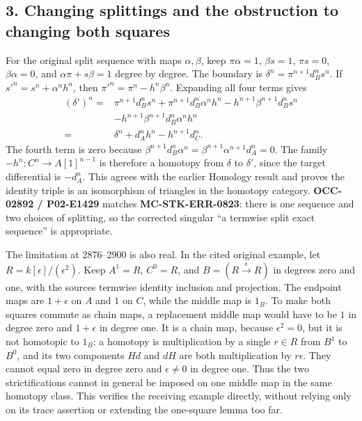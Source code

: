 \subsection{3. Changing splittings and the obstruction to changing both squares}\label{proofs-2419-2994-changing-splittings-and-the-obstruction-to-changing-both-squares}

For the original split sequence with maps \(\alpha,\beta\),\allowbreak{} keep \(\pi\alpha=1\),\allowbreak{} \(\beta s=1\),\allowbreak{} \(\pi s=0\),\allowbreak{} \(\beta\alpha=0\),\allowbreak{} and \(\alpha\pi+s\beta=1\) degree by degree. The boundary is \(\delta^n=\pi^{n+1}d_B^ns^n\). If \(s'^n=s^n+\alpha^nh^n\),\allowbreak{} then \(\pi'^n=\pi^n-h^n\beta^n\). Expanding all four terms gives \[
\begin{split}
(\delta')^n={}&\pi^{n+1}d_B^ns^n
+\pi^{n+1}d_B^n\alpha^nh^n
-h^{n+1}\beta^{n+1}d_B^ns^n\\
&-h^{n+1}\beta^{n+1}d_B^n\alpha^nh^n\\
={}&\delta^n+d_A^nh^n-h^{n+1}d_C^n.
\end{split}
\] The fourth term is zero because \(\beta^{n+1}d_B^n\alpha^n=\beta^{n+1}\alpha^{n+1}d_A^n=0\). The family \(-h^n:C^n\to A[1]^{n-1}\) is therefore a homotopy from \(\delta\) to \(\delta'\),\allowbreak{} since the target differential is \(-d_A^n\). This agrees with the earlier Homology result and proves the identity triple is an isomorphism of triangles in the homotopy category. \textbf{OCC-02892 /\allowbreak{} P02-E1429} matches \textbf{MC-STK-ERR-0823}:\allowbreak{} there is one sequence and two choices of splitting,\allowbreak{} so the corrected singular ``a termwise split exact sequence'' is appropriate.

The limitation at 2876–\allowbreak{}2900 is also real. In the cited original example,\allowbreak{} let \(R=k[\epsilon]/(\epsilon^2)\). Keep \(A^1=R\),\allowbreak{} \(C^0=R\),\allowbreak{} and \(B=(R\xrightarrow\epsilon R)\) in degrees zero and one,\allowbreak{} with the source\textquotesingle s termwise identity inclusion and projection. The endpoint maps are \(1+\epsilon\) on \(A\) and \(1\) on \(C\),\allowbreak{} while the middle map is \(1_B\). To make both squares commute as chain maps,\allowbreak{} a replacement middle map would have to be \(1\) in degree zero and \(1+\epsilon\) in degree one. It is a chain map,\allowbreak{} because \(\epsilon^2=0\),\allowbreak{} but it is not homotopic to \(1_B\):\allowbreak{} a homotopy is multiplication by a single \(r\in R\) from \(B^1\) to \(B^0\),\allowbreak{} and its two components \(Hd\) and \(dH\) are both multiplication by \(r\epsilon\). They cannot equal zero in degree zero and \(\epsilon\ne0\) in degree one. Thus the two strictifications cannot in general be imposed on one middle map in the same homotopy class. This verifies the receiving example directly,\allowbreak{} without relying only on its trace assertion or extending the one-square lemma too far.

